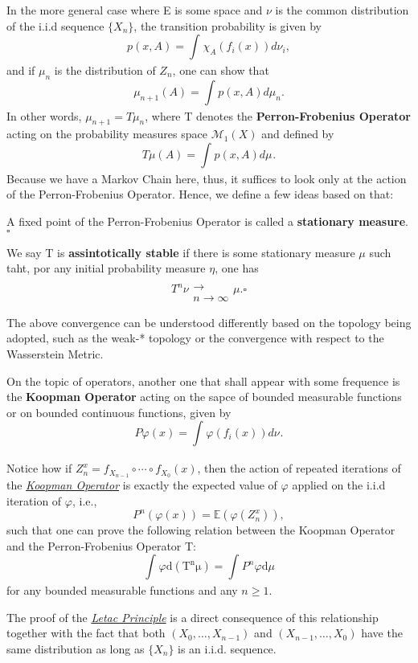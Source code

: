 \documentclass[../stationary_ifs.tex]{subfiles}
\begin{document}
In the more general case where E is some space and \(\nu \) is the common distribution of the i.i.d sequence \(\{X_{n}\}\), the transition probability is given by
\[
	p(x, A) = \int_{}\chi_{A}(f_{i}(x)) d\nu_{i},
\]
and if \(\mu_{n}\) is the distribution of \(Z_{n}\), one can show that
\[
	\mu_{n+1}(A) = \int_{}p(x, A) d\mu_{n}.
\]
In other words, \(\mu_{n+1} = T \mu_{n}\), where T denotes the \textbf{Perron-Frobenius Operator} acting on the probability measures space \(\mathcal{M}_1(X)\) and defined by
\[
	T\mu (A) = \int_{}p(x, A) d\mu_{}.
\]
Because we have a Markov Chain here, thus, it suffices to look only at the action of the Perron-Frobenius Operator. Hence, we define a few ideas based on that:
\begin{def*}
	A fixed point of the Perron-Frobenius Operator is called a \textbf{stationary measure}. \(\square\)
\end{def*}
\begin{def*}
	We say T is \textbf{assintotically stable} if there is some stationary measure \(\mu \) such taht, por any initial probability measure \(\eta \), one has
	\[
		T^{n}\nu \substack{ \\ \longrightarrow \\ n\to \infty} \mu . \square
	\]
\end{def*}
The above convergence can be understood differently based on the topology being adopted, such as the weak-* topology or the convergence with respect to the Wasserstein Metric.

On the topic of operators, another one that shall appear with some frequence is the \hypertarget{koopman_operator}{\textbf{Koopman Operator}} acting on the sapce of bounded measurable functions or
on bounded continuous functions, given by
\[
	P\varphi (x)=\int_{}\varphi(f_{i}(x)) d\nu_{}.
\]
\begin{tcolorbox}[
		skin=enhanced,
		title=Observação,
		fonttitle=\bfseries,
		colframe=black,
		colbacktitle=cyan!75!white,
		colback=cyan!15,
		colbacklower=black,
		coltitle=black,
		drop fuzzy shadow,
	]
	Notice how if \(Z_{n}^{x} = f_{X_{n-1}}\circ \cdots\circ f_{X_{0}}(x)\), then the action of repeated iterations of the \hyperlink{koopman_operator}{\textit{Koopman Operator}} is exactly the expected value of \(\varphi \) applied on the
	i.i.d iteration of \(\varphi \), i.e.,
	\[
		P^{n}(\varphi (x)) = \mathbb{E}(\varphi(Z_{n}^{x})),
	\]
	such that one can prove the following relation between the Koopman Operator and the Perron-Frobenius Operator T:
	\[
		\int_{}^{}\varphi  \mathrm{d(T^{n}\mu )} = \int_{}^{}P^{n}\varphi  \mathrm{d}\mu
	\]
	for any bounded measurable functions and any \(n\geq 1\).

	The proof of the \hyperlink{letac_principle}{\textit{Letac Principle}} is a direct consequence of this relationship together with the fact that both \((X_{0}, \dotsc , X_{n-1})\) and \((X_{n-1}, \dotsc , X_{0})\) have the same distribution
	as long as \(\{X_{n}\}\) is an i.i.d. sequence.
\end{tcolorbox}
\end{document}
